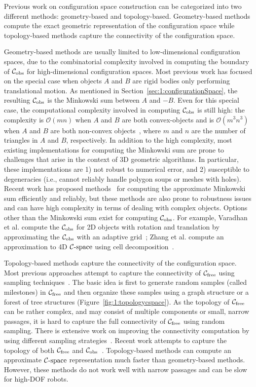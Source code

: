 Previous work on configuration space construction can be categorized into two different methods: geometry-based and topology-based. Geometry-based methods compute the exact geometric representation of the configuration space while topology-based methods capture the connectivity of the configuration space.

Geometry-based methods are usually limited to low-dimensional configuration spaces, due to the combinatorial complexity involved in computing the boundary of $\mathcal C_{\text{obs}}$ for high-dimensional configuration spaces. Most previous work has focused on the special case when objects $A$ and $B$ are rigid bodies only performing translational motion. As mentioned in Section~\ref{sec:1:configurationSpace}, the resulting $\mathcal C_{\text{obs}}$ is the Minkowski sum between $A$ and $-B$. Even for this special case, the computational complexity involved in computing $\mathcal C_{\text{obs}}$ is still high: the complexity is $\mathcal O(mn)$ when $A$ and $B$ are both convex-objects and is $\mathcal O(m^3n^3)$ when $A$ and $B$ are both non-convex objects~\cite{Halperin:2002:RGC}, where $m$ and $n$ are the number of triangles in $A$ and $B$, respectively. In addition to the high complexity, most existing implementations for computing the Minkowski sum are prone to challenges that arise in the context of 3D geometric algorithms. In particular, these implementations are 1) not robust to numerical error, and 2) susceptible to degeneracies (i.e., cannot reliably handle polygon soups or meshes with holes). Recent work has proposed methods~\cite{Lien:2008:CMS,Lien:2007:ACD,Lien:2009:ASM} for computing the approximate Minkowski sum efficiently and reliably, but these methods are also prone to robustness issues and can have high complexity in terms of dealing with complex objects. Options other than the Minkowski sum exist for computing  $\mathcal C_{\text{obs}}$. For example, Varadhan et al. compute the $\mathcal C_{\text{obs}}$ for 2D objects with rotation and translation by approximating the $\mathcal C_{\text{obs}}$ with an adaptive grid~\cite{Varadhan:2006:TPA}; Zhang et al. compute an approximation to 4D $\mathcal C\text{-space}$ using cell decomposition~\cite{Zhang:2007:IROS}.

Topology-based methods capture the connectivity of the configuration space. Most previous approaches attempt to capture the connectivity of $\mathcal C_{\text{free}}$ using sampling techniques~\cite{Kavraki96,Kuffner00}. The basic idea is first to generate random samples (called milestones) in $\mathcal C_{\text{free}}$ and then organize these samples using a graph structure or a forest of tree structures (Figure~\ref{fig:1:topologycspace}). As the topology of $\mathcal C_{\text{free}}$ can be rather complex, and
may consist of multiple components or small, narrow passages, it is hard to capture the full connectivity of $\mathcal C_{\text{free}}$ using random sampling. There is extensive work on improving the connectivity computation by using different sampling strategies~\cite{Amato:1998:OOP,Boor:1999:ICRA,Hsu:1998:FNP,Rodriguez:2006,Zhang:2008:ICRA,Zheng:2005}. Recent work attempts to capture the topology of both $\mathcal C_{\text{free}}$ and $\mathcal C_{\text{obs}}$~\cite{Jory:2011:IROS}. Topology-based methods can compute an approximate $\mathcal C\text{-space}$ representation much faster than geometry-based methods. However, these methods do not work well with narrow passages and can be slow for high-DOF robots.


